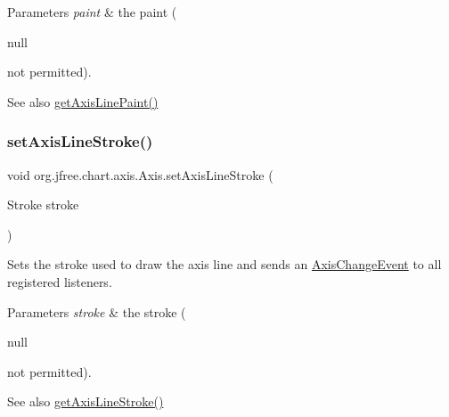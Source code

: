 \begin{DoxyParams}{Parameters}
{\em paint} & the paint (
\begin{DoxyCode}
null 
\end{DoxyCode}
 not permitted).\\
\hline
\end{DoxyParams}
\begin{DoxySeeAlso}{See also}
\mbox{\hyperlink{classorg_1_1jfree_1_1chart_1_1axis_1_1_axis_a6d10951b7f082f0857398d5fa30642d2}{get\+Axis\+Line\+Paint()}} 
\end{DoxySeeAlso}
\mbox{\label{classorg_1_1jfree_1_1chart_1_1axis_1_1_axis_acb2ef4578aff9ebd3fff36596b86ad9a}} 
\subsubsection{\texorpdfstring{set\+Axis\+Line\+Stroke()}{setAxisLineStroke()}}
{\footnotesize\ttfamily void org.\+jfree.\+chart.\+axis.\+Axis.\+set\+Axis\+Line\+Stroke (\begin{DoxyParamCaption}\item[{Stroke}]{stroke }\end{DoxyParamCaption})}

Sets the stroke used to draw the axis line and sends an \mbox{\hyperlink{}{Axis\+Change\+Event}} to all registered listeners.


\begin{DoxyParams}{Parameters}
{\em stroke} & the stroke (
\begin{DoxyCode}
null 
\end{DoxyCode}
 not permitted).\\
\hline
\end{DoxyParams}
\begin{DoxySeeAlso}{See also}
\mbox{\hyperlink{classorg_1_1jfree_1_1chart_1_1axis_1_1_axis_ab999e7ef49b87ddc75e07eb5658661b5}{get\+Axis\+Line\+Stroke()}} 
\end{DoxySeeAlso}
\mbox{\label{classorg_1_1jfree_1_1chart_1_1axis_1_1_axis_a9b25030b0d5848884c269ef1f9a73601}} 
